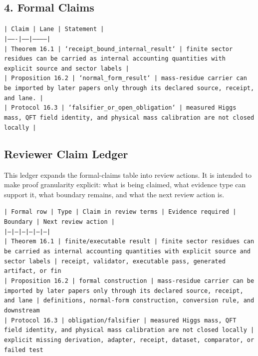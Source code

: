 \documentclass[11pt]{article}
\begin{document}
\subsection*{4. Formal Claims}

\noindent\texttt{| Claim | Lane | Statement |}\\
\noindent\texttt{|-------|------|-----------|}\\
\noindent\texttt{| Theorem 16.1 | `receipt\_bound\_internal\_result` | finite sector residues can be carried as internal accounting quantities with explicit source and sector labels |}\\
\noindent\texttt{| Proposition 16.2 | `normal\_form\_result` | mass-residue carrier can be imported by later papers only through its declared source, receipt, and lane. |}\\
\noindent\texttt{| Protocol 16.3 | `falsifier\_or\_open\_obligation` | measured Higgs mass, QFT field identity, and physical mass calibration are not closed locally |}\\

\subsection*{Reviewer Claim Ledger}

This ledger expands the formal-claims table into review actions. It is intended to make proof granularity explicit: what is being claimed, what evidence type can support it, what boundary remains, and what the next review action is.

\noindent\texttt{| Formal row | Type | Claim in review terms | Evidence required | Boundary | Next review action |}\\
\noindent\texttt{|---|---|---|---|---|---|}\\
\noindent\texttt{| Theorem 16.1 | finite/executable result | finite sector residues can be carried as internal accounting quantities with explicit source and sector labels | receipt, validator, executable pass, generated artifact, or fin}\\
\noindent\texttt{| Proposition 16.2 | formal construction | mass-residue carrier can be imported by later papers only through its declared source, receipt, and lane | definitions, normal-form construction, conversion rule, and downstream}\\
\noindent\texttt{| Protocol 16.3 | obligation/falsifier | measured Higgs mass, QFT field identity, and physical mass calibration are not closed locally | explicit missing derivation, adapter, receipt, dataset, comparator, or failed test }\\
\end{document}
